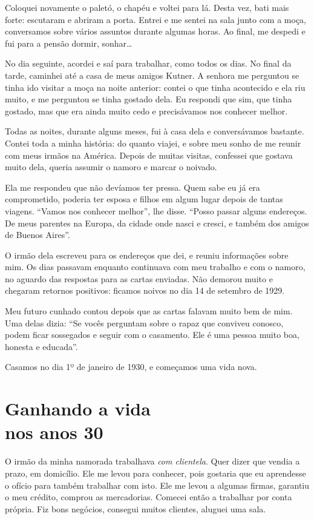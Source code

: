 Coloquei novamente o paletó, o chapéu e voltei para lá. Desta vez, bati mais
forte: escutaram e abriram a porta. Entrei e me sentei na sala junto com a moça, 
conversamos sobre vários assuntos durante algumas horas. Ao final, me
despedi e fui para a pensão dormir, sonhar\ldots

No dia seguinte, acordei e saí para trabalhar, como todos os dias. No final da tarde,
caminhei até a casa de meus amigos Kutner. A senhora me perguntou se
tinha ido visitar a moça na noite anterior: contei o que tinha
acontecido e ela riu muito, e me perguntou se tinha gostado dela. Eu respondi 
que sim, que tinha gostado, mas que era ainda muito
cedo e precisávamos nos conhecer melhor.

Todas as noites, durante alguns meses, fui à casa dela e conversávamos bastante. Contei toda a minha história: do quanto viajei, e
sobre meu sonho de me reunir com meus irmãos na América. Depois de muitas visitas, 
confessei que gostava muito dela, queria assumir o namoro e
marcar o noivado.

Ela me respondeu que não devíamos ter pressa. Quem sabe eu já era
comprometido, poderia ter esposa e filhos em algum lugar depois de tantas viagens. 
``Vamos nos conhecer melhor'', lhe disse. ``Posso passar alguns endereços. De meus parentes na Europa, da
cidade onde nasci e cresci, e também dos amigos de Buenos Aires''.

O irmão dela escreveu para os endereços que dei, e reuniu informações
sobre mim. Os dias passavam enquanto continuava com meu
trabalho e com o namoro, no aguardo das respostas para as cartas enviadas. Não
demorou muito e chegaram retornos positivos: ficamos noivos no dia 14 de
setembro de 1929.

Meu futuro cunhado contou depois que as cartas falavam muito bem de mim. Uma delas dizia: ``Se vocês perguntam sobre o rapaz que conviveu
conosco, podem ficar sossegados e seguir com o casamento. Ele é uma pessoa
muito boa, honesta e educada''.

Casamos no dia 1º de janeiro de 1930, e começamos uma vida nova.%

\chapter*{Ganhando a vida\\nos anos 30}

O irmão da minha namorada trabalhava \textit{com clientela}. Quer dizer que vendia a
prazo, em domicílio. Ele me levou para conhecer, pois gostaria que eu aprendesse o ofício
para também trabalhar com isto. Ele me levou a algumas firmas, garantiu o meu crédito, comprou as
mercadorias. Comecei então a trabalhar por conta própria. Fiz bons
negócios, consegui muitos clientes, aluguei uma sala. 


